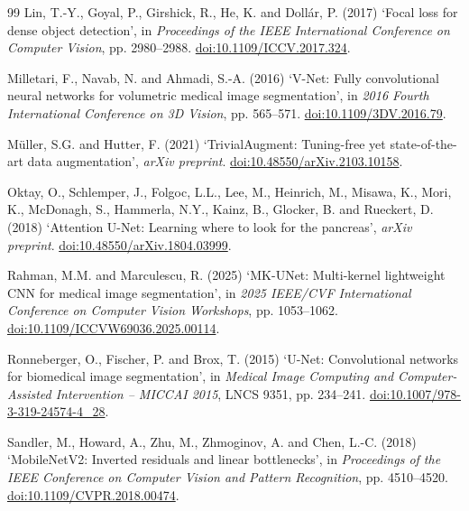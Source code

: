 \documentclass[12pt,a4paper,oneside]{report}
\begin{document}
\begin{thebibliography}{99}
Lin, T.-Y., Goyal, P., Girshick, R., He, K. and Dollár, P. (2017)
`Focal loss for dense object detection',
in \textit{Proceedings of the IEEE International Conference on Computer Vision}, pp. 2980--2988.
\href{https://doi.org/10.1109/ICCV.2017.324}{doi:10.1109/ICCV.2017.324}.

Milletari, F., Navab, N. and Ahmadi, S.-A. (2016)
`V-Net: Fully convolutional neural networks for volumetric medical image segmentation',
in \textit{2016 Fourth International Conference on 3D Vision}, pp. 565--571.
\href{https://doi.org/10.1109/3DV.2016.79}{doi:10.1109/3DV.2016.79}.

Müller, S.G. and Hutter, F. (2021)
`TrivialAugment: Tuning-free yet state-of-the-art data augmentation',
\textit{arXiv preprint}.
\href{https://doi.org/10.48550/arXiv.2103.10158}{doi:10.48550/arXiv.2103.10158}.

Oktay, O., Schlemper, J., Folgoc, L.L., Lee, M., Heinrich, M., Misawa, K., Mori, K., McDonagh, S., Hammerla, N.Y., Kainz, B., Glocker, B. and Rueckert, D. (2018)
`Attention U-Net: Learning where to look for the pancreas',
\textit{arXiv preprint}.
\href{https://doi.org/10.48550/arXiv.1804.03999}{doi:10.48550/arXiv.1804.03999}.

Rahman, M.M. and Marculescu, R. (2025)
`MK-UNet: Multi-kernel lightweight CNN for medical image segmentation',
in \textit{2025 IEEE/CVF International Conference on Computer Vision Workshops}, pp. 1053--1062.
\href{https://doi.org/10.1109/ICCVW69036.2025.00114}{doi:10.1109/ICCVW69036.2025.00114}.

Ronneberger, O., Fischer, P. and Brox, T. (2015)
`U-Net: Convolutional networks for biomedical image segmentation',
in \textit{Medical Image Computing and Computer-Assisted Intervention -- MICCAI 2015}, LNCS 9351, pp. 234--241.
\href{https://doi.org/10.1007/978-3-319-24574-4_28}{doi:10.1007/978-3-319-24574-4\_28}.

Sandler, M., Howard, A., Zhu, M., Zhmoginov, A. and Chen, L.-C. (2018)
`MobileNetV2: Inverted residuals and linear bottlenecks',
in \textit{Proceedings of the IEEE Conference on Computer Vision and Pattern Recognition}, pp. 4510--4520.
\href{https://doi.org/10.1109/CVPR.2018.00474}{doi:10.1109/CVPR.2018.00474}.


\end{thebibliography}
\end{document}
